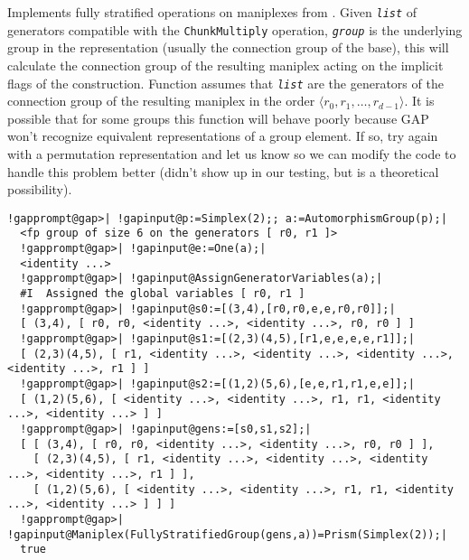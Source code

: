 \documentclass[a4paper,11pt]{report}
\begin{document}
{{{ Implements fully stratified operations on maniplexes from \cite{CunPelWil22}. Given \mbox{\texttt{\mdseries\slshape list}} of generators compatible with the \texttt{ChunkMultiply} operation, \mbox{\texttt{\mdseries\slshape group}} is the underlying group in the representation (usually the connection group of
the base), this will calculate the connection group of the resulting maniplex
acting on the implicit flags of the construction. Function assumes that \mbox{\texttt{\mdseries\slshape list}} are the generators of the connection group of the resulting maniplex in the
order $\langle r_0, r_1, \ldots, r_{d-1}\rangle$. It is possible that for some groups this function will behave poorly because
GAP won't recognize equivalent representations of a group element. If so, try
again with a permutation representation and let us know so we can modify the
code to handle this problem better (didn't show up in our testing, but is a
theoretical possibility). }

 
\begin{Verbatim}[commandchars=!@|,fontsize=\small,frame=single,label=Example]
  !gapprompt@gap>| !gapinput@p:=Simplex(2);; a:=AutomorphismGroup(p);|
  <fp group of size 6 on the generators [ r0, r1 ]>
  !gapprompt@gap>| !gapinput@e:=One(a);|
  <identity ...>
  !gapprompt@gap>| !gapinput@AssignGeneratorVariables(a);|
  #I  Assigned the global variables [ r0, r1 ]
  !gapprompt@gap>| !gapinput@s0:=[(3,4),[r0,r0,e,e,r0,r0]];|
  [ (3,4), [ r0, r0, <identity ...>, <identity ...>, r0, r0 ] ]
  !gapprompt@gap>| !gapinput@s1:=[(2,3)(4,5),[r1,e,e,e,e,r1]];|
  [ (2,3)(4,5), [ r1, <identity ...>, <identity ...>, <identity ...>, <identity ...>, r1 ] ]
  !gapprompt@gap>| !gapinput@s2:=[(1,2)(5,6),[e,e,r1,r1,e,e]];|
  [ (1,2)(5,6), [ <identity ...>, <identity ...>, r1, r1, <identity ...>, <identity ...> ] ]
  !gapprompt@gap>| !gapinput@gens:=[s0,s1,s2];|
  [ [ (3,4), [ r0, r0, <identity ...>, <identity ...>, r0, r0 ] ], 
    [ (2,3)(4,5), [ r1, <identity ...>, <identity ...>, <identity ...>, <identity ...>, r1 ] ], 
    [ (1,2)(5,6), [ <identity ...>, <identity ...>, r1, r1, <identity ...>, <identity ...> ] ] ]
  !gapprompt@gap>| !gapinput@Maniplex(FullyStratifiedGroup(gens,a))=Prism(Simplex(2));|
  true
\end{Verbatim}
 }

 }

   
\end{document}
